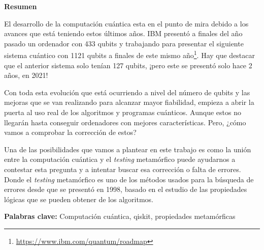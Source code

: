 \newpage

\thispagestyle{empty}

\begin{center}

{\bf \Huge Resumen}

  \end{center}
\vspace{1cm}

 El desarrollo de la computación cuántica esta en el punto de mira debido a los avances que está teniendo estos últimos años. IBM presentó a finales del año pasado un ordenador con 433 qubits y trabajando para presentar el siguiente sistema cuántico con 1121 qubits a finales de este mismo año\footnote{\url{https://www.ibm.com/quantum/roadmap}}. Hay que destacar que el anterior sistema solo tenían 127 qubits, ¡pero este se presentó solo hace 2 años, en 2021! \newline

Con toda esta evolución que está ocurriendo a nivel del número de qubits y las mejoras que se van realizando para alcanzar mayor fiabilidad, empieza a abrir la puerta al uso real de los algoritmos y programas cuánticos. Aunque estos no llegarán hasta conseguir ordenadores con mejores características. Pero, ¿cómo vamos a comprobar la corrección de estos? \newline 

Una de las posibilidades que vamos a plantear en este trabajo es como la unión entre la computación cuántica y el \textit{testing} metamórfico puede ayudarnos a contestar esta pregunta y a intentar buscar esa corrección o falta de errores. Donde el \textit{testing} metamórfico es uno de los métodos usados para la búsqueda de errores desde que se presentó en 1998, basado en el estudio de las propiedades lógicas que se pueden obtener de los algoritmos.

\vspace{1cm}



\textbf{Palabras clave:} Computación cuántica, qiskit, propiedades metamórficas
   
   
   